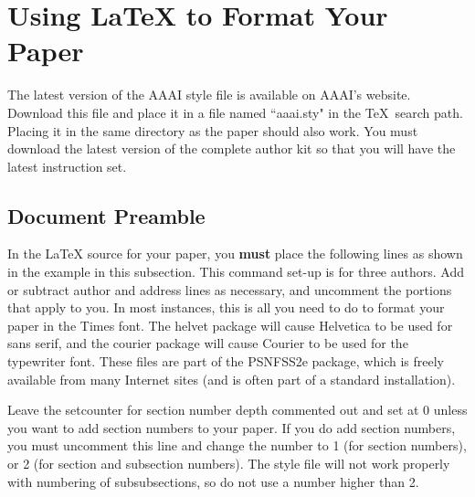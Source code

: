 \documentclass[letterpaper]{article}
\begin{document}
\section{Using \LaTeX{} to Format Your Paper}

The latest version of the AAAI style file is available on AAAI's website. Download this file and place it in a file named ``aaai.sty" in the \TeX\ search path. Placing it in the same directory as the paper should also work. You must download the latest version of the complete author kit so that you will have the latest instruction set.

\subsection{Document Preamble}

In the \LaTeX{} source for your paper, you \textbf{must} place the following lines as shown in the example in this subsection. This command set-up is for three authors. Add or subtract author and address lines as necessary, and uncomment the portions that apply to you. In most instances, this is all you need to do to format your paper in the Times font. The helvet package will cause Helvetica to be used for sans serif, and the courier package will cause Courier to be used for the typewriter font. These files are part of the PSNFSS2e package, which is freely available from many Internet sites (and is often part of a standard installation).

Leave the setcounter for section number depth commented out and set at 0 unless you want to add section numbers to your paper. If you do add section numbers, you must uncomment this line and change the number to 1 (for section numbers), or 2 (for section and subsection numbers). The style file will not work properly with numbering of subsubsections, so do not use a number higher than 2.
\end{document}
